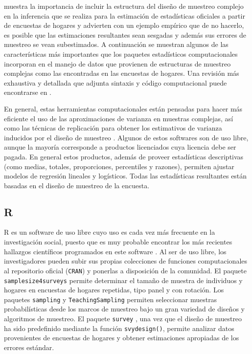 \documentclass[
  10pt,
  spanish,
]{book}
\begin{document}
\citet[sección 7.8]{United_Nations_2005} muestra la importancia de incluir la estructura del diseño de muestreo complejo en la inferencia que se realiza para la estimación de estadísticas oficiales a partir de encuestas de hogares y advierten con un ejemplo empírico que de no hacerlo, es posible que las estimaciones resultantes sean sesgadas y además sus errores de muestreo se vean subestimados. A continuación se muestran algunos de las características más importantes que los paquetes estadísticos computacionales incorporan en el manejo de datos que provienen de estructuras de muestreo complejas como las encontradas en las encuestas de hogares. Una revisión más exhaustiva y detallada que adjunta sintaxis y código computacional puede encontrarse en \citet[Apéndice A]{Heeringa_West_Berglund_2010}.

En general, estas herramientas computacionales están pensadas para hacer más eficiente el uso de las aproximaciones de varianza en muestras complejas, así como las técnicas de replicación para obtener los estimativos de varianza inducidos por el diseño de muestreo \citep{Westat_2007}. Algunos de estos softwares son de uso libre, aunque la mayoría corresponde a productos licenciados cuya licencia debe ser pagada. En general estos productos, además de proveer estadísticas descriptivas (como medias, totales, proporciones, percentiles y razones), permiten ajustar modelos de regresión lineales y logísticos. Todas las estadísticas resultantes están basadas en el diseño de muestreo de la encuesta.

\hypertarget{r}{%
\subsection*{R}\label{r}}

R es un software de uso libre cuyo uso es cada vez más frecuente en la investigación social, puesto que es muy probable encontrar los más recientes hallazgos científicos programados en este software \citep{R_2017}. Al ser de uso libre, los investigadores pueden subir sus propias colecciones de funciones computacionales al repositorio oficial (\texttt{CRAN}) y ponerlas a disposición de la comunidad. El paquete \texttt{samplesize4surveys} \citep{ss4s} permite determinar el tamaño de muestra de individuos y hogares en encuestas de hogares repetidas, tipo panel y con rotación. Los paquetes \texttt{sampling} \citep{Yves} y \texttt{TeachingSampling} \citep{TS} permiten seleccionar muestras probabilísticas desde los marcos de muestreo bajo un gran variedad de diseños y algoritmos de muestreo. El paquete \texttt{survey} \citep{TL}, una vez que el diseño de muestreo ha sido predefinido mediante la función \texttt{svydesign()}, permite analizar datos provenientes de encuestas de hogares y obtener estimaciones apropiadas de los errores estándar.
\end{document}
